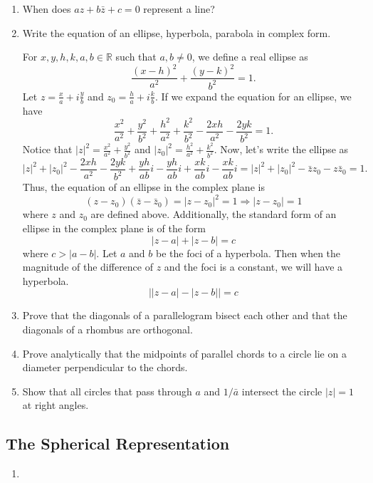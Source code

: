 \begin{enumerate}
\item
  When does \(az + b\bar{z} + c = 0\) represent a line?
\item
  Write the equation of an ellipse, hyperbola, parabola in complex form.
  \par\smallskip
  For \(x,y,h,k,a,b\in\mathbb{R}\) such that \(a,b\neq 0\), we define a real
  ellipse as
  \[
  \frac{(x - h)^2}{a^2} + \frac{(y - k)^2}{b^2} = 1.
  \]
  Let \(z = \frac{x}{a} + i\frac{y}{b}\) and
  \(z_0 = \frac{h}{a} + i\frac{k}{b}\).
  If we expand the equation for an ellipse, we have
  \[
  \frac{x^2}{a^2} + \frac{y^2}{b^2} + \frac{h^2}{a^2} + \frac{k^2}{b^2} -
  \frac{2xh}{a^2} - \frac{2yk}{b^2} = 1.
  \]
  Notice that \(\lvert z\rvert^2 = \frac{x^2}{a^2} + \frac{y^2}{b^2}\) and
  \(\lvert z_0\rvert^2 = \frac{h^2}{a^2} + \frac{k^2}{b^2}\).
  Now, let's write the ellipse as
  \[
  \lvert z\rvert^2 + \lvert z_0\rvert^2 - \frac{2xh}{a^2} - \frac{2yk}{b^2} +
  \frac{yh}{ab}i - \frac{yh}{ab}i + \frac{xk}{ab}i - \frac{xk}{ab}i =
  \lvert z\rvert^2 + \lvert z_0\rvert^2 - \bar{z}z_0 - z\bar{z}_0 = 1.
  \]
  Thus, the equation of an ellipse in the complex plane is
  \[
  (z - z_0)(\bar{z} - \bar{z}_0) = \lvert z - z_0\rvert^2 = 1\Rightarrow
  \lvert z - z_0\rvert = 1
  \]
  where \(z\) and \(z_0\) are defined above.
  Additionally, the standard form of an ellipse in the complex plane is of the
  form
  \[
  \lvert z - a\rvert + \lvert z - b\rvert = c
  \]
  where \(c > \lvert a - b\rvert\).
  Let \(a\) and \(b\) be the foci of a hyperbola.
  Then when the magnitude of the difference of \(z\) and the foci is a constant, we will have a hyperbola.
  \[
  \bigl\lvert\lvert z - a\rvert - \lvert z - b\rvert\bigr\rvert = c
  \]
\item
  Prove that the diagonals of a parallelogram bisect each other and that the
  diagonals of a rhombus are orthogonal.
\item
  Prove analytically that the midpoints of parallel chords to a circle lie on a
  diameter perpendicular to the chords.
\item
  Show that all circles that pass through \(a\) and \(1/\bar{a}\) intersect the
  circle \(\lvert z\rvert = 1\) at right angles.
\end{enumerate}

\subsection{The Spherical Representation}

\begin{enumerate}
\item 
\end{enumerate}


